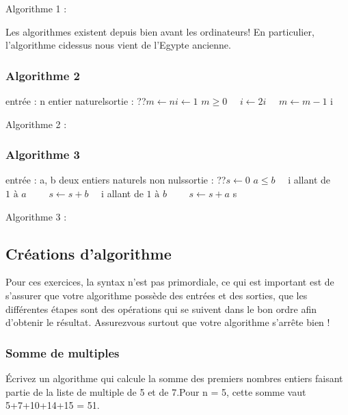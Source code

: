 \documentclass[letterpaper,10pt,english]{sphinxmanual}
\begin{document}
Algorithme 1 :

 Les algorithmes existent depuis bien avant les ordinateurs! En particulier, l’algorithme ci\sphinxhyphen{}dessus nous vient de l’Egypte ancienne.


\subsubsection{Algorithme 2}
\label{\detokenize{src/OCI_HS1_Algorithmes:algorithme-2}}
entrée : n entier naturelsortie : ??\(m \leftarrow n\)\(i \leftarrow 1 \) \(m \ge 0 \)\(\quad\) \(i \leftarrow 2i \)\(\quad\) \(m \leftarrow m - 1\) i

Algorithme 2 :


\subsubsection{Algorithme 3}
\label{\detokenize{src/OCI_HS1_Algorithmes:algorithme-3}}
entrée : a, b deux entiers naturels non nulssortie : ??\(s \leftarrow 0\) \(a \le b\)\(\quad\)  i allant de \(1 \text{ à } a\)\(\qquad\) \(s \leftarrow s + b \)\(\quad\)  i allant de \(1 \text{ à } b\)\(\qquad\) \(s \leftarrow s + a \) s

Algorithme 3 :


\subsection{Créations d’algorithme}
\label{\detokenize{src/OCI_HS1_Algorithmes:creations-d-algorithme}}
Pour ces exercices, la syntax n’est pas primordiale, ce qui est important est de s’assurer que votre algorithme possède des entrées et des sorties, que les différentes étapes sont des opérations  qui se suivent dans le bon ordre afin d’obtenir le résultat. Assurez\sphinxhyphen{}vous surtout que votre algorithme s’arrête bien !


\subsubsection{Somme de multiples}
\label{\detokenize{src/OCI_HS1_Algorithmes:somme-de-multiples}}
Écrivez un algorithme qui calcule la somme des  premiers nombres entiers faisant partie de la liste de multiple de 5 et de 7.Pour n = 5, cette somme vaut 5+7+10+14+15 = 51.
\end{document}
